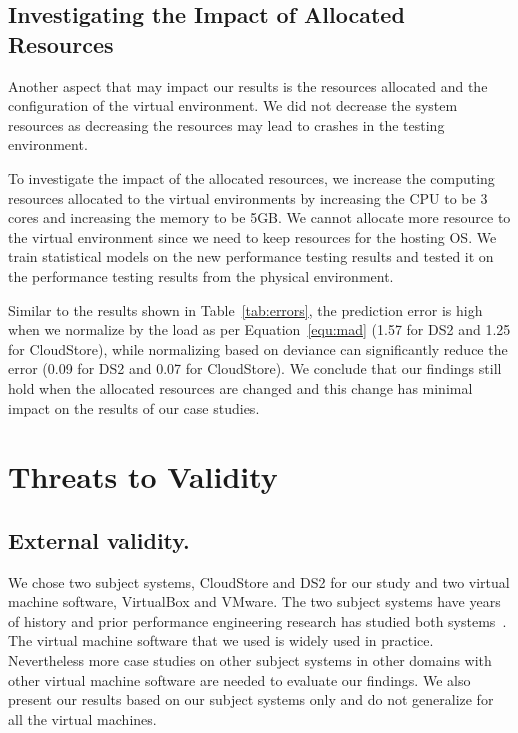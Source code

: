 \documentclass[smallextended]{svjour3}       %
\begin{document}
\subsection{Investigating the Impact of Allocated Resources}

Another aspect that may impact our results is the resources allocated and the configuration of the virtual environment. We did not decrease the system resources as decreasing the resources may lead to crashes in the testing environment.

To investigate the impact of the allocated resources, we increase the computing resources allocated to the virtual environments by increasing the CPU to be 3 cores and increasing the memory to be 5GB. We cannot allocate more resource to the virtual environment since we need to keep resources for the hosting OS. We train statistical models on the new performance testing results and tested it on the performance testing results from the physical environment. 

Similar to the results shown in Table~\ref{tab:errors}, the prediction error is high when we normalize by the load as per Equation~\ref{equ:mad} (1.57 for DS2 and 1.25 for CloudStore), while normalizing based on deviance can significantly reduce the error (0.09 for DS2 and 0.07 for CloudStore). We conclude that our findings still hold when the allocated resources are changed and this change has minimal impact on the results of our case studies.


	
\section{Threats to Validity}
\label{sec:threats}


\subsection{External validity.}
We chose two subject systems, CloudStore and DS2 for our study and two virtual machine software, VirtualBox and VMware. The two subject systems have years of history and prior performance engineering research has studied both systems~\cite{jackicsm2009,Nguyen:2012:ADP:2188286.2188344,tarekmsr16}. The virtual machine software that we used is widely used in practice. Nevertheless more case studies on other subject systems in other domains with other virtual machine software are needed to evaluate our findings. We also present our results based on our subject systems only and do not generalize for all the virtual machines.
\end{document}
